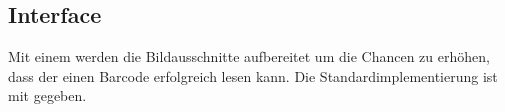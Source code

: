 \subsection*{Interface }
Mit einem  werden die Bildausschnitte aufbereitet um die Chancen zu erhöhen, dass der  einen Barcode erfolgreich lesen kann.
Die Standardimplementierung ist mit  gegeben.

